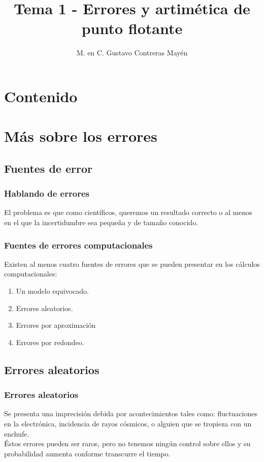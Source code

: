 \documentclass[12pt]{beamer}
\title{\large{Tema 1 - Errores y artimética de punto flotante}}
\author{M. en C. Gustavo Contreras Mayén}
\date{ }
\begin{document}
\maketitle

\section*{Contenido}

\section{Más sobre los errores}
\subsection{Fuentes de error}
\begin{frame}
\frametitle{Hablando de errores}
El problema es que como científicos, queremos un resultado correcto o al menos en el que la incertidumbre sea pequeña y de tamaño conocido.
\end{frame}
\begin{frame}
\frametitle{Fuentes de errores computacionales}
Existen al menos cuatro fuentes de errores que se pueden presentar en los cálculos computacionales:
\pause
{}
\begin{enumerate}[<+->]
\item Un modelo equivocado.
\item Errores aleatorios.
\item Errores por aproximación
\item Errores por redondeo.
\end{enumerate}
\end{frame}

\subsection{Errores aleatorios}

\begin{frame}
\frametitle{Errores aleatorios}
Se presenta una imprecisión debida por acontecimientos tales como: fluctuaciones en la electrónica, incidencia de rayos cósmicos, o alguien que se tropieza con un enchufe.
\\
\bigskip
\pause
Éstos errores pueden ser raros, pero no tenemos ningún control sobre ellos y su probabilidad aumenta conforme transcurre el tiempo.
\end{frame}
\end{document}
